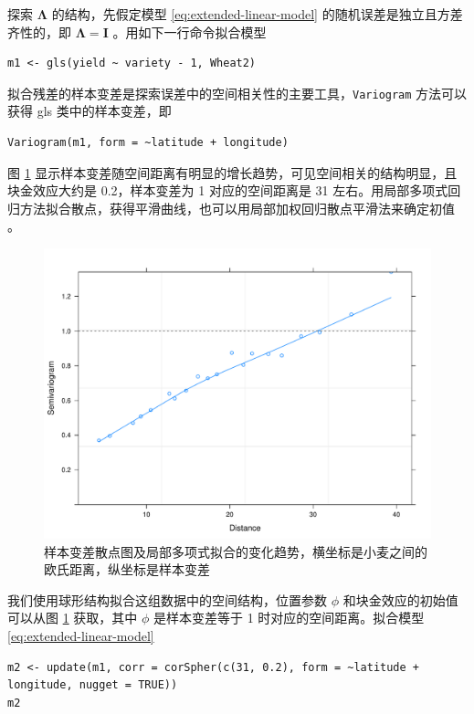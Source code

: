 \documentclass[12pt,a4paper,UTF8,twoside]{book}
\theoremstyle{definition}
\theoremstyle{definition}
\theoremstyle{definition}
\theoremstyle{remark}
\begin{document}
探索 \(\boldsymbol{\Lambda}\) 的结构，先假定模型
\eqref{eq:extended-linear-model} 的随机误差是独立且方差齐性的，即
\(\boldsymbol{\Lambda} = \boldsymbol{I}\) 。用如下一行命令拟合模型

\begin{verbatim}
m1 <- gls(yield ~ variety - 1, Wheat2)
\end{verbatim}

拟合残差的样本变差是探索误差中的空间相关性的主要工具，\texttt{Variogram}
方法可以获得 gls 类中的样本变差，即

\begin{verbatim}
Variogram(m1, form = ~latitude + longitude)
\end{verbatim}

图 \ref{fig:yields-variogram}
显示样本变差随空间距离有明显的增长趋势，可见空间相关的结构明显，且块金效应大约是
0.2，样本变差为 1 对应的空间距离是 31
左右。用局部多项式回归方法拟合散点，获得平滑曲线，也可以用局部加权回归散点平滑法来确定初值
\citep{Xie2008COS}。

\begin{figure}

{\centering \includegraphics[width=0.7\linewidth]{figures/Yields-Variogram} 

}

\caption{样本变差散点图及局部多项式拟合的变化趋势，横坐标是小麦之间的欧氏距离，纵坐标是样本变差}\label{fig:yields-variogram}
\end{figure}

我们使用球形结构拟合这组数据中的空间结构，位置参数 \(\phi\)
和块金效应的初始值可以从图 \ref{fig:yields-variogram} 获取，其中
\(\phi\) 是样本变差等于 1 时对应的空间距离。拟合模型
\eqref{eq:extended-linear-model}

\begin{verbatim}
m2 <- update(m1, corr = corSpher(c(31, 0.2), form = ~latitude + longitude, nugget = TRUE))
m2
\end{verbatim}
\end{document}
